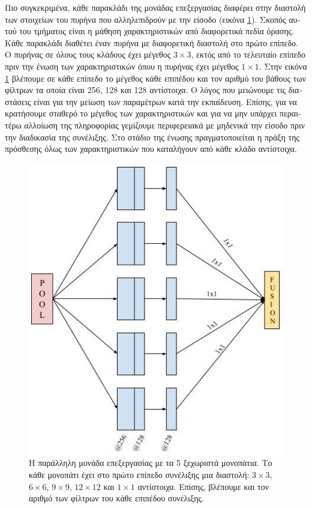 \par
\textgreek{Πιο συγκεκριμένα, κάθε παρακλάδι της μονάδας επεξεργασίας διαφέρει στην διαστολή των στοιχείων του πυρήνα που αλληλεπιδρούν με την είσοδο (εικόνα }\ref{fig:parallel_unit}). \textgreek{Σκοπός αυτού του τμήματος είναι η μάθηση χαρακτηριστικών από διαφορετικά πεδία όρασης. Κάθε παρακλάδι διαθέτει έναν πυρήνα με διαφορετική διαστολή στο πρώτο επίπεδο. Ο πυρήνας σε όλους τους κλάδους έχει μέγεθος $3\times 3$, εκτός από το τελευταίο επίπεδο πριν την ένωση των χαρακτηριστικών όπου η πυρήνας έχει μέγεθος $1\times 1$. Στην εικόνα }\ref{fig:parallel_unit} \textgreek{βλέπουμε σε κάθε επίπεδο το μέγεθος κάθε επιπέδου και τον αριθμό του βάθους των φίλτρων τα οποία είναι 256, 128 και 128 αντίστοιχα. Ο λόγος που μειώνουμε τις διαστάσεις είναι για την μείωση των παραμέτρων κατά την εκπαίδευση. Επίσης, για να κρατήσουμε σταθερό το μέγεθος των χαρακτηριστικών και για να μην υπάρχει περαιτέρω αλλοίωση της πληροφορίας γεμίζουμε περιφερειακά με μηδενικά την είσοδο πριν την διαδικασία της συνέλιξης. Στο στάδιο της ένωσης πραγματοποιείται η πράξη της πρόσθεσης όλως των χαρακτηριστικών που καταλήγουν από κάθε κλάδο αντίστοιχα.}

\begin{figure}[H]
 \centering
 \includegraphics[scale=0.55]{Images/parallel_1}
  \caption[\textgreek{Παράλληλη Μονάδα Επεξεργασίας}]{\textgreek{Η παράλληλη μονάδα επεξεργασίας με τα 5 ξεχωριστά μονοπάτια. Το κάθε μονοπάτι έχει στο πρώτο επίπεδο συνέλιξης μια διαστολή: $3\times 3$, $6\times6$, $9\times9$, $12\times12$ και $1\times1$ αντίστοιχα. Επίσης, βλέπουμε και τον αριθμό των φίλτρων του κάθε επιπέδου συνέλιξης.} }
 \label{fig:parallel_unit}
\end{figure}


